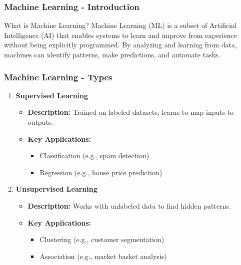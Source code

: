 \documentclass[aspectratio=169]{beamer}
\begin{document}
\begin{frame}
    \frametitle{Machine Learning - Introduction}
    \begin{block}{What is Machine Learning?}
        Machine Learning (ML) is a subset of Artificial Intelligence (AI) that enables systems to learn and improve from experience without being explicitly programmed. By analyzing and learning from data, machines can identify patterns, make predictions, and automate tasks.
    \end{block}
\end{frame}

\begin{frame}
    \frametitle{Machine Learning - Types}
    \begin{enumerate}
        \item \textbf{Supervised Learning}
            \begin{itemize}
                \item \textbf{Description:} Trained on labeled datasets; learns to map inputs to outputs.
                \item \textbf{Key Applications:}
                    \begin{itemize}
                        \item Classification (e.g., spam detection)
                        \item Regression (e.g., house price prediction)
                    \end{itemize}
            \end{itemize}

        \item \textbf{Unsupervised Learning}
            \begin{itemize}
                \item \textbf{Description:} Works with unlabeled data to find hidden patterns.
                \item \textbf{Key Applications:}
                    \begin{itemize}
                        \item Clustering (e.g., customer segmentation)
                        \item Association (e.g., market basket analysis)
                    \end{itemize}
            \end{itemize}


\end{enumerate}
\end{frame}
\end{document}
